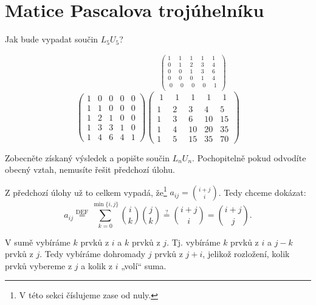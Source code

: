 \documentclass[12pt]{article}					%
\begin{document}
\section{Matice Pascalova trojúhelníku}
    \begin{priklad}[3.1]
        Jak bude vypadat součin $L_5U_5$?

        \begin{reseni}
                $$ \begin{pmatrix} 1 & 0 & 0 & 0 & 0 \\ 1 & 1 & 0 & 0 & 0 \\ 1 & 2 & 1 & 0 & 0 \\ 1 & 3 & 3 & 1 & 0 \\ 1 & 4 & 6 & 4 & 1 \end{pmatrix} \overset{\displaystyle\begin{pmatrix} 1 & 1 & 1 & 1 & 1 \\ 0 & 1 & 2 & 3 & 4 \\ 0 & 0 & 1 & 3 & 6 \\ 0 & 0 & 0 & 1 & 4 \\ \phantom{|}0\phantom{|} & \phantom{|}0\phantom{|} & \phantom{|}0\phantom{|} & \phantom{|}0\phantom{|} & \phantom{|}1\phantom{|} \end{pmatrix}}{\begin{pmatrix} \phantom{|}1\phantom{|} & \phantom{|}1\phantom{|} & \phantom{|}1\phantom{|} & \phantom{|}1\phantom{|} & \phantom{|}1\phantom{|} \\ 1 & 2 & 3 & 4 & 5 \\ 1 & 3 & 6 & 10 & 15 \\ 1 & 4 & 10 & 20 & 35 \\ 1 & 5 & 15 & 35 & 70 \end{pmatrix}} $$ 
        \end{reseni}
    \end{priklad}

    \begin{priklad}[3.2]
        Zobecněte získaný výsledek a popište součin $L_nU_n$. Pochopitelně pokud odvodíte obecný vztah, nemusíte řešit předchozí úlohu.

        \begin{reseni}
            Z předchozí úlohy už to celkem vypadá, že\footnote{V této sekci číslujeme zase od nuly.} $a_{ij} = \binom{i+j}{i}$. Tedy chceme dokázat:
            $$ a_{ij} \overset{\text{DEF}}{=} \sum_{k=0}^{\min\{i, j\}}\binom{i}{k}\binom{j}{k} \overset{?}{=} \binom{i+j}{i} = \binom{i+j}{j}. $$ 
        \end{reseni}

        \begin{dukazin}
            V sumě vybíráme $k$ prvků z $i$ a $k$ prvků z $j$. Tj. vybíráme $k$ prvků z $i$ a $j - k$ prvků z $j$. Tedy vybíráme dohromady $j$ prvků z $j+i$, jelikož rozložení, kolik prvků vybereme z $j$ a kolik z $i$ „volí“ suma.
        \end{dukazin}
    \end{priklad}
\end{document}
